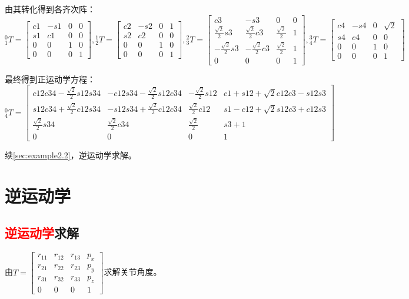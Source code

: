 \documentclass[
12pt, %
a4paper, 
oneside, %
]{scrartcl}
\begin{document}
{\footnotesize
由其转化得到各齐次阵：
$$
{}^0_1T = \begin{bmatrix} c1 & -s1 & 0 & 0 \\ s1 & c1 & 0 & 0 \\ 0 & 0 & 1 & 0 \\ 0 & 0 & 0 & 1 \end{bmatrix},
{}^1_2T = \begin{bmatrix} c2 & -s2 & 0 & 1 \\ s2 & c2 & 0 & 0 \\ 0 & 0 & 1 & 0 \\ 0 & 0 & 0 & 1 \end{bmatrix},
{}^2_3T = \begin{bmatrix} c3 & -s3 & 0 & 0 \\ \frac{\sqrt{2}}{2}s3 & \frac{\sqrt{2}}{2}c3 & \frac{\sqrt{2}}{2} & 1 \\ -\frac{\sqrt{2}}{2}s3 & -\frac{\sqrt{2}}{2}c3 & \frac{\sqrt{2}}{2} & 1 \\ 0 & 0 & 0 & 1 \end{bmatrix},
{}^3_4T = \begin{bmatrix} c4 & -s4 & 0 & \sqrt{2} \\ s4 & c4 & 0 & 0 \\ 0 & 0 & 1 & 0 \\ 0 & 0 & 0 & 1 \end{bmatrix}
$$

最终得到正运动学方程：
$$ {}^0_4T = \begin{bmatrix} c12 c34 - \frac{\sqrt{2}}{2}s12 s34 & -c12 s34 - \frac{\sqrt{2}}{2}s12 c34 & -\frac{\sqrt{2}}{2}s12 & c1 + s12 + \sqrt{2}c12 c3 - s12 s3 \\ s12 c34 + \frac{\sqrt{2}}{2}c12 s34 & -s12 s34 + \frac{\sqrt{2}}{2}c12 c34 & \frac{\sqrt{2}}{2}c12 & s1 - c12 + \sqrt{2}s12 c3 + c12 s3 \\ \frac{\sqrt{2}}{2}s34 & \frac{\sqrt{2}}{2}c34 & \frac{\sqrt{2}}{2} & s3 + 1 \\ 0 & 0 & 0 & 1 \end{bmatrix} $$

续\ref{sec:example2.2}，逆运动学求解。
}
\section{逆运动学}
\subsection[逆运动学求解]{\textcolor{red}{逆运动学}求解}
由$ T = \begin{bmatrix} r_{11} & r_{12} & r_{13} & p_x \\ r_{21} & r_{22} & r_{23} & p_y \\ r_{31} & r_{32} & r_{33} & p_z \\ 0 & 0 & 0 & 1 \end{bmatrix} $求解关节角度。
\end{document}
